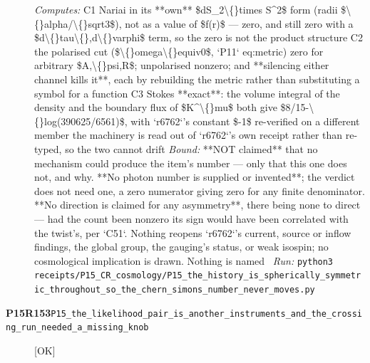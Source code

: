 \begin{description}
\emph{Computes:} C1 Nariai in its **own** \$dS\_2\textbackslash\{\}times S\textasciicircum{}2\$ form (radii \$\textbackslash\{\}alpha/\textbackslash\{\}sqrt3\$), not as a value of \$f(r)\$ --- zero, and still zero with a \$d\textbackslash\{\}tau\textbackslash\{\},d\textbackslash\{\}varphi\$ term, so the zero is not the product structure  C2 the polarised cut (\$\textbackslash\{\}omega\textbackslash\{\}equiv0\$, `P11` eq:metric) zero for arbitrary \$A,\textbackslash\{\}psi,R\$; unpolarised nonzero; and **silencing either channel kills it**, each by rebuilding the metric rather than substituting a symbol for a function  C3 Stokes **exact**: the volume integral of the density and the boundary flux of \$K\textasciicircum{}\textbackslash\{\}mu\$ both give \$8/15-\textbackslash\{\}log(390625/6561)\$, with `r6762`'s constant \$-1\$ re-verified on a different member  the machinery is read out of `r6762`'s own receipt rather than re-typed, so the two cannot drift
 \emph{Bound:}  **NOT claimed** that no mechanism could produce the item's number --- only that this one does not, and why. **No photon number is supplied or invented**; the verdict does not need one, a zero numerator giving zero for any finite denominator. **No direction is claimed for any asymmetry**, there being none to direct --- had the count been nonzero its sign would have been correlated with the twist's, per `C51`. Nothing reopens `r6762`'s current, source or inflow findings, the global group, the gauging's status, or weak isospin; no cosmological implication is drawn. Nothing is named
\ \emph{Run:} \texttt{python3 receipts/P15\_CR\_cosmology/P15\_the\_history\_is\_spherically\_symmetric\_throughout\_so\_the\_chern\_simons\_number\_never\_moves.py}
\item[\rcptlabel{P15_the_likelihood_pair_is_another_instruments_and_the_crossing_run_needed_a_missing_knob}{P15R153}\textbf{P15R153}\quad\texttt{P15\_the\_likelihood\_pair\_is\_another\_instruments\_and\_the\_crossing\_run\_needed\_a\_missing\_knob}]\hfill\textsf{[OK]}\\

\end{description}
